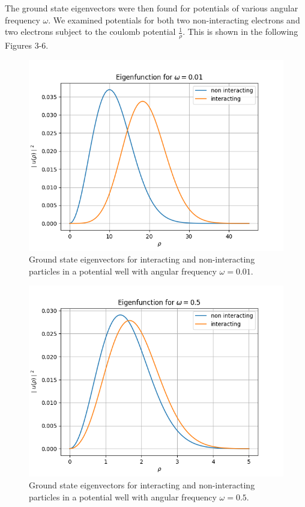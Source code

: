 \documentclass{emulateapj}
\begin{document}
The ground state eigenvectors were then found for potentials of various angular frequency $\omega$. We examined potentials for both two non-interacting electrons and two electrons subject to the coulomb potential $\frac{1}{\rho}$. This is shown in the following Figures 3-6.
\begin{figure}[H]
    \centering
    \includegraphics[scale=0.5]{omega_01.png}
    \caption{Ground state eigenvectors for interacting and non-interacting particles in a potential well with angular frequency $\omega = 0.01$.}
    \label{fig:3}
\end{figure}
\begin{figure}[H]
    \centering
    \includegraphics[scale=0.5]{omega_5.png}
    \caption{Ground state eigenvectors for interacting and non-interacting particles in a potential well with angular frequency $\omega = 0.5$.}
    \label{fig:4}
\end{figure}
\end{document}
